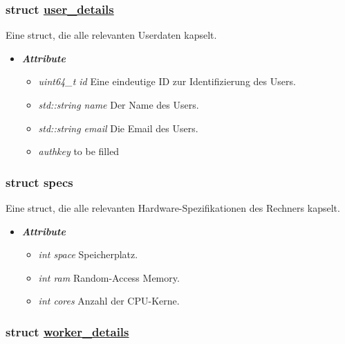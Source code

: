 \documentclass[a4paper,12pt]{article}
\newcommand\purl[1]{\protect\url{#1}}
\begin{document}
\subsubsection{struct \purl{user_details}}

Eine struct, die alle relevanten Userdaten kapselt.

\begin{itemize}[label={}]

	\item \textit{\textbf{Attribute}}
		\begin{itemize}[label={\textbullet}]
			\item \textit{uint64\_t id} Eine eindeutige ID zur Identifizierung des Users.
			
			\item \textit{std::string name} Der Name des Users.
			
			\item \textit{std::string email} Die Email des Users.
			
			\item \textit{authkey} to be filled
		\end{itemize}


\end{itemize}

\subsubsection{struct specs}

Eine struct, die alle relevanten Hardware-Spezifikationen des Rechners kapselt.


\begin{itemize}[label={}]

	\item \textit{\textbf{Attribute}}
		\begin{itemize}[label={\textbullet}]
			\item \textit{int space} Speicherplatz.
			
			\item \textit{int ram} Random-Access Memory.
			
			\item \textit{int cores} Anzahl der CPU-Kerne.
			
		\end{itemize}


\end{itemize}
\subsubsection{struct \purl{worker_details}}
\end{document}
